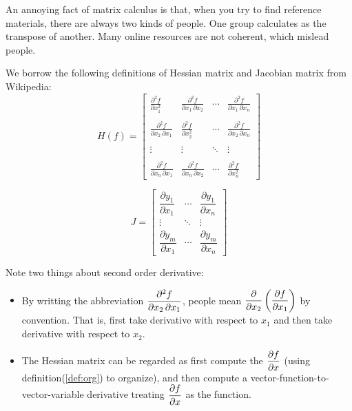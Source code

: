 An annoying fact of matrix calculus is that, when you 
try to find reference materials, there are always two kinds 
of people. One group calculates as the transpose of another. 
Many online resources are not coherent, which mislead people. 

We borrow the following definitions of Hessian matrix\cite{wiki_hesse} 
and Jacobian matrix\cite{wiki_jacobian} from Wikipedia: 
\begin{equation}
	H(f) = 
	\left[
	\begin{matrix}
\frac{\partial^2 f}{\partial x_1^2} & \frac{\partial^2 f}{\partial x_1\,\partial x_2} & \cdots & \frac{\partial^2 f}{\partial x_1\,\partial x_n} \\  \\
\frac{\partial^2 f}{\partial x_2\,\partial x_1} & \frac{\partial^2 f}{\partial x_2^2} & \cdots & \frac{\partial^2 f}{\partial x_2\,\partial x_n} \\  \\
\vdots & \vdots & \ddots & \vdots \\  \\
\frac{\partial^2 f}{\partial x_n\,\partial x_1} & \frac{\partial^2 f}{\partial x_n\,\partial x_2} & \cdots & \frac{\partial^2 f}{\partial x_n^2}
	\end{matrix}
	\right]
\end{equation}

\begin{equation}
	J = 
	\left[
	\begin{matrix}
\dfrac{\partial y_1}{\partial x_1} & \cdots & \dfrac{\partial y_1}{\partial x_n} \\ \vdots & \ddots & \vdots \\ \dfrac{\partial y_m}{\partial x_1} & \cdots & \dfrac{\partial y_m}{\partial x_n}
	\end{matrix}
	\right]
\end{equation}

Note two things about second order derivative:
\begin{itemize}
	\item By writting the abbreviation $\dfrac{\partial^2 f}{\partial x_2\,\partial x_1}$, 
	people mean $\dfrac{\partial }{\partial x_2}\left(\dfrac{\partial f}{\partial x_1}\right)$ by 
	convention. That is, first take derivative with respect to $x_1$ and 
	then take derivative with respect to $x_2$. 
	\item The Hessian matrix can be regarded as first compute the 
	$\dfrac{\partial f}{\partial x}$
	(using definition(\ref{def:org}) to organize), and then compute 
	a vector-function-to-vector-variable derivative
	treating $\dfrac{\partial f}{\partial x}$ as the function. 
\end{itemize}

